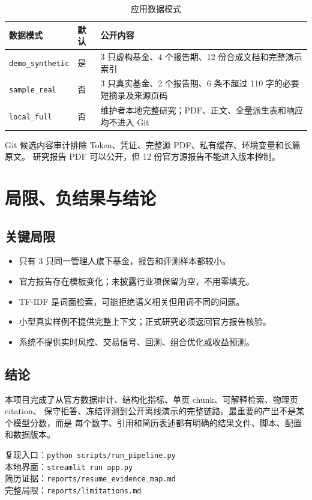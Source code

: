 \documentclass[UTF8,fontset=windows,11pt,a4paper]{ctexart}
\begin{document}
\begin{table}[H]
\centering
{}
\begin{tabularx}{\linewidth}{p{3.1cm} p{1.8cm} X}
\toprule
\textbf{数据模式} & \textbf{默认} & \textbf{公开内容} \\
\midrule
\texttt{demo\_synthetic} & 是 &
3 只虚构基金、4 个报告期、12 份合成文档和完整演示索引 \\
\texttt{sample\_real} & 否 &
3 只真实基金、2 个报告期、6 条不超过 110 字的必要短摘录及来源页码 \\
\texttt{local\_full} & 否 &
维护者本地完整研究；PDF、正文、全量派生表和响应均不进入 Git \\
\bottomrule
\end{tabularx}
\caption{应用数据模式}
\end{table}

Git 候选内容审计排除 Token、凭证、完整源 PDF、私有缓存、环境变量和长篇原文。
研究报告 PDF 可以公开，但 12 份官方源报告不能进入版本控制。

\clearpage
\section{局限、负结果与结论}

\subsection{关键局限}

\begin{itemize}
  \item 只有 3 只同一管理人旗下基金，报告和评测样本都较小。
  \item 官方报告存在模板变化；未披露行业项保留为空，不用零填充。
  \item TF-IDF 是词面检索，可能拒绝语义相关但用词不同的问题。
  \item 小型真实样例不提供完整上下文；正式研究必须返回官方报告核验。
  \item 系统不提供实时风控、交易信号、回测、组合优化或收益预测。
\end{itemize}

\subsection{结论}

本项目完成了从官方数据审计、结构化指标、单页 chunk、可解释检索、物理页 citation、
保守拒答、冻结评测到公开离线演示的完整链路。最重要的产出不是某个模型分数，而是
每个数字、引用和简历表述都有明确的结果文件、脚本、配置和数据版本。

\vfill
{\small\color{slate}
复现入口：\texttt{python scripts/run\_pipeline.py}\\
本地界面：\texttt{streamlit run app.py}\\
简历证据：\texttt{reports/resume\_evidence\_map.md}\\
完整局限：\texttt{reports/limitations.md}
}
\end{document}
